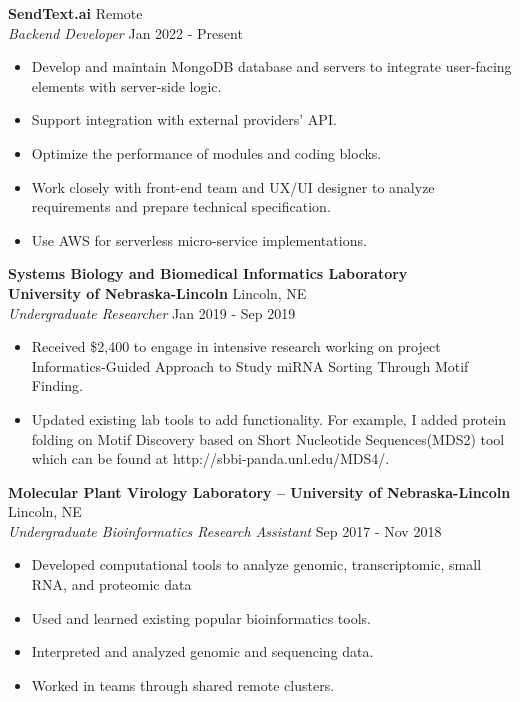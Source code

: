 \documentclass[a4paper]{article}
\begin{document}
\textbf{SendText.ai} \hfill Remote\\
\textit{Backend Developer} \hfill Jan 2022 - Present\\
\vspace{-1mm}
\begin{itemize} \itemsep 1pt
	\item Develop and maintain MongoDB database and servers to integrate user-facing elements with server-side logic.
	\item Support integration with external providers’ API.
	\item Optimize the performance of modules and coding blocks.
	\item Work closely with front-end team and UX/UI designer to analyze requirements and prepare technical specification.
	\item Use AWS for serverless micro-service implementations.
\end{itemize}
\textbf{Systems Biology and Biomedical Informatics Laboratory\\ University of Nebraska-Lincoln} \hfill Lincoln, NE\\
\textit{Undergraduate Researcher} \hfill Jan 2019 - Sep 2019\\
\vspace{-1mm}
\begin{itemize} \itemsep 1pt
	\item Received \$2,400 to engage in intensive research working on project \textquotedbl{}Informatics-Guided Approach to Study miRNA Sorting Through Motif Finding\textquotedbl{}.
	\item Updated existing lab tools to add functionality. For example, I added protein folding on Motif Discovery based on Short Nucleotide Sequences(MDS2) tool which can be found at http://sbbi-panda.unl.edu/MDS4/.
\end{itemize}
\textbf{Molecular Plant Virology Laboratory – University of Nebraska-Lincoln} \hfill Lincoln, NE\\
\textit{Undergraduate Bioinformatics Research Assistant} \hfill Sep 2017 - Nov 2018\\
\vspace{-1mm}
\begin{itemize} \itemsep 1pt
	\item Developed computational tools to analyze genomic, transcriptomic, small RNA, and proteomic data
	\item Used and learned existing popular bioinformatics tools.
	\item Interpreted and analyzed genomic and sequencing data.
	\item Worked in teams through shared remote clusters.
\end{itemize}
\end{document}
